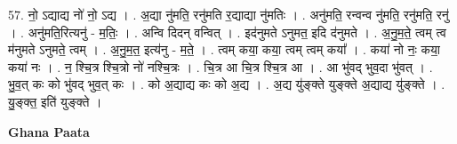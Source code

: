 \documentclass[17pt]{extarticle}
\begin{document}
57. नो॒ ऽद्याद्य नो॑ नो॒ ऽद्य । . अ॒द्या नु॑मति॒ रनु॑मति र॒द्याद्या नु॑मतिः । . अनु॑मति॒ रन्वन्व नु॑मति॒ रनु॑मति॒ रनु॑ । . अनु॑मति॒रित्यनु॑ - म॒तिः॒ । . अन्वि दिदन् वन्वित् । . इद॑नुमते ऽनुमत॒ इदि द॑नुमते । . अ॒नु॒म॒ते॒ त्वम् त्व म॑नुमते ऽनुमते॒ त्वम् । . अ॒नु॒म॒त॒ इत्य॑नु - म॒ते॒ । . त्वम् कया॒ कया॒ त्वम् त्वम् कया᳚ । . कया॑ नो नः॒ कया॒ कया॑ नः । . न॒ श्चि॒त्र श्चि॒त्रो नो॑ नश्चि॒त्रः । . चि॒त्र आ चि॒त्र श्चि॒त्र आ । . आ भु॑वद् भुव॒दा भु॑वत् । . भु॒व॒त् कः को भु॑वद् भुव॒त् कः । . को अ॒द्याद्य कः को अ॒द्य । . अ॒द्य यु॑ङ्क्ते युङ्क्ते अ॒द्याद्य यु॑ङ्क्ते । . यु॒ङ्क्त॒ इति॑ युङ्क्ते । \newline

\textbf{Ghana Paata } \newline
\end{document}
